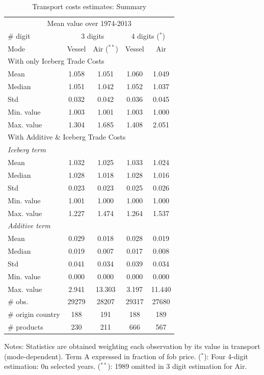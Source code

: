 \documentclass[a4paper,11pt]{article}
\begin{document}
\begin{table}[htbp]
  \centering
  \footnotesize{
  \caption{Transport costs estimates: Summary \label{tab:summary_results}}
  \begin{center}
    \begin{tabular}{l|cc|cc}
      \hline \hline
    \multicolumn{5}{c}{Mean value over 1974-2013}   \\
    \# digit & \multicolumn{2}{c}{3 digits} & \multicolumn{2}{c}{4 digits ($^\ast$)} \\ \hline
    Mode  & Vessel & Air ($^{\ast \ast}$) & Vessel & Air \\ \hline
    \multicolumn{5}{l}{With only Iceberg Trade Costs }  \\ \hline
    Mean  & 1.058 & 1.051 & 1.060 & 1.049 \\
    Median & 1.051 & 1.042 & 1.052 & 1.037 \\
    Std   & 0.032 & 0.042 & 0.036 & 0.045 \\
    Min. value & 1.003 & 1.001 & 1.003 & 1.000 \\
    Max. value & 1.304 & 1.685 & 1.408 & 2.051 \\ \hline
    \multicolumn{5}{l}{With Additive \& Iceberg Trade Costs } \\ \hline
   \textit{Iceberg term} & & & & \\ \hline
    Mean  & 1.032 & 1.025 & 1.033 & 1.024 \\
    Median & 1.028 & 1.018 & 1.028 & 1.016 \\
    Std   & 0.023 & 0.023 & 0.025 & 0.026 \\
    Min. value & 1.001 & 1.000 & 1.000 & 1.000 \\
    Max. value & 1.227 & 1.474 & 1.264 & 1.537 \\ \hline
    \textit{Additive term }& & & &   \\ \hline
    Mean  & 0.029 & 0.018 & 0.028 & 0.019 \\
    Median & 0.019 & 0.007 & 0.017 & 0.008 \\
    Std   & 0.041 & 0.034 & 0.039 & 0.034 \\
    Min. value & 0.000 & 0.000 & 0.000 & 0.000 \\
    Max. value & 2.941 & 13.303 & 3.197 & 11.440 \\ \hline
        \# obs. & 29279 & 28207 & 29317 & 27680 \\
    \# origin country & 188 & 191 & 188 & 189 \\
    \# products & 230 & 211 & 666 & 567 \\  \hline \hline
  \end{tabular}
    \end{center}}
\parbox[l]{8cm}{\tiny{Notes: Statistics are obtained weighting each observation by its value in transport (mode-dependent). Term A expressed in fraction of fob price. ($^\ast$): Four 4-digit estimation: 0n selected years. ($^{\ast \ast}$): 1989 omitted in 3 digit estimation for Air.}}
\end{table}%
\end{document}
